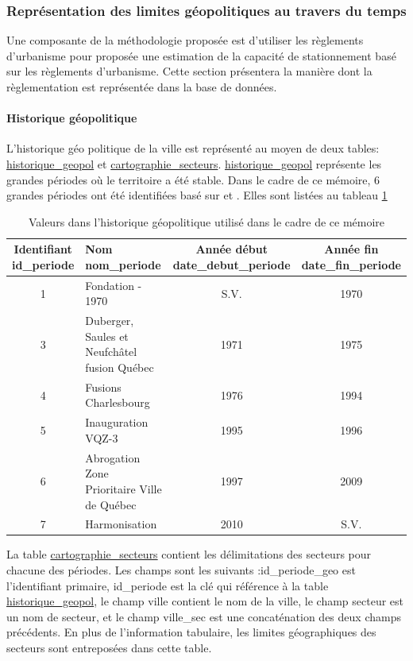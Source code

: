     
    \subsubsection{Représentation des limites géopolitiques au travers du temps} 
    Une composante de la méthodologie proposée est d'utiliser les règlements d'urbanisme pour proposée une estimation de la capacité de stationnement basé sur les règlements d'urbanisme. Cette section présentera la manière dont la règlementation est représentée dans la base de données.
    \paragraph{Historique géopolitique} L'historique géo politique de la ville est représenté au moyen de deux tables: \underline{historique\_geopol} et \underline{cartographie\_secteurs}. \underline{historique\_geopol} représente les grandes périodes où le territoire a été stable. Dans le cadre de ce mémoire, 6 grandes périodes ont été identifiées basé sur \textcite{VilledeQuebec:ReperesChronologique:} et \textcite{ElectionsQuebec:AtlasHistorique:2021}. Elles sont listées au tableau \ref{tab:histo_geopol}
    \begin{table}
    \centering
    \begin{tabular}{c p{5cm} c c}
    \hline
    \makecell{Identifiant\\ id\_periode} & \makecell[l]{Nom \\ nom\_periode} & \makecell{Année début \\ date\_debut\_periode} & \makecell{Année fin \\ date\_fin\_periode}\\ \hline
    1 & Fondation - 1970 &  S.V. & 1970 \\
    3 & Duberger, Saules et Neufchâtel fusion Québec & 1971 & 1975 \\
    4 & Fusions Charlesbourg & 1976 & 1994 \\
    5 & Inauguration VQZ-3 & 1995 & 1996 \\
    6 & Abrogation Zone Prioritaire Ville de Québec & 1997 & 2009 \\
    7 & Harmonisation & 2010 & S.V.\\ \hline
    \end{tabular}
    \caption{Valeurs dans l'historique géopolitique utilisé dans le cadre de ce mémoire}\label{tab:histo_geopol}
    \end{table}
    \FloatBarrier
    La table \underline{cartographie\_secteurs} contient les délimitations des secteurs pour chacune des périodes. Les champs sont les suivants :id\_periode\_geo est l'identifiant primaire, id\_periode est la clé qui référence à la table \underline{historique\_geopol}, le champ ville contient le nom de la ville, le champ secteur est un nom de secteur, et le champ ville\_sec est une concaténation des deux champs précédents. En plus de l'information tabulaire, les limites géographiques des secteurs sont entreposées dans cette table. \par
